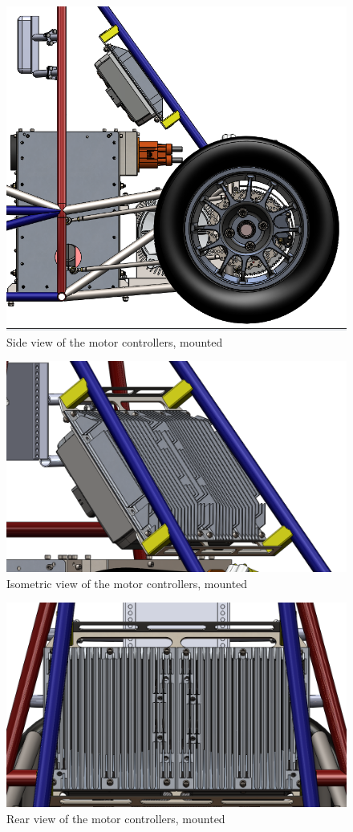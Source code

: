 \documentclass{article}
\begin{document}
            \begin{figure}[H]
                \centering
                \includegraphics[width = 0.6 \textwidth]{motorcontroller_sideview}
                \caption{Side view of the motor controllers, mounted}
                \label{mcsideview}
            \end{figure}

            \begin{figure}[H]
                \centering
                \includegraphics[width = 0.6 \textwidth]{motorcontroller_isoview}
                \caption{Isometric view of the motor controllers, mounted}
                \label{mciso}
            \end{figure}

            \begin{figure}[H]
                \centering
                \includegraphics[width = 0.6 \textwidth]{motorcontroller_rearview}
                \caption{Rear view of the motor controllers, mounted}
                \label{mcrearview}
            \end{figure}
\end{document}
